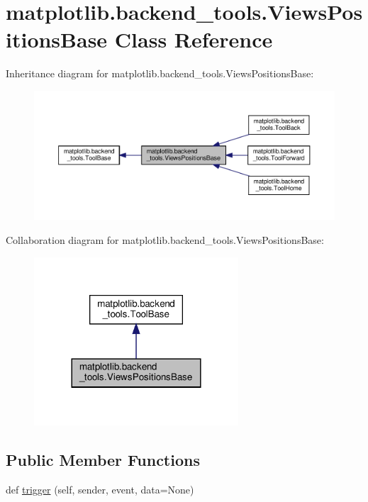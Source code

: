 \hypertarget{classmatplotlib_1_1backend__tools_1_1ViewsPositionsBase}{}\section{matplotlib.\+backend\+\_\+tools.\+Views\+Positions\+Base Class Reference}
\label{classmatplotlib_1_1backend__tools_1_1ViewsPositionsBase}


Inheritance diagram for matplotlib.\+backend\+\_\+tools.\+Views\+Positions\+Base\+:
\nopagebreak
\begin{figure}[H]
\begin{center}
\leavevmode
\includegraphics[width=350pt]{classmatplotlib_1_1backend__tools_1_1ViewsPositionsBase__inherit__graph}
\end{center}
\end{figure}


Collaboration diagram for matplotlib.\+backend\+\_\+tools.\+Views\+Positions\+Base\+:
\nopagebreak
\begin{figure}[H]
\begin{center}
\leavevmode
\includegraphics[width=216pt]{classmatplotlib_1_1backend__tools_1_1ViewsPositionsBase__coll__graph}
\end{center}
\end{figure}
\subsection*{Public Member Functions}
\begin{DoxyCompactItemize}
\item 
def \hyperlink{classmatplotlib_1_1backend__tools_1_1ViewsPositionsBase_abd774ce26501992ca64a6b34e6ff5455}{trigger} (self, sender, event, data=None)
\end{DoxyCompactItemize}
